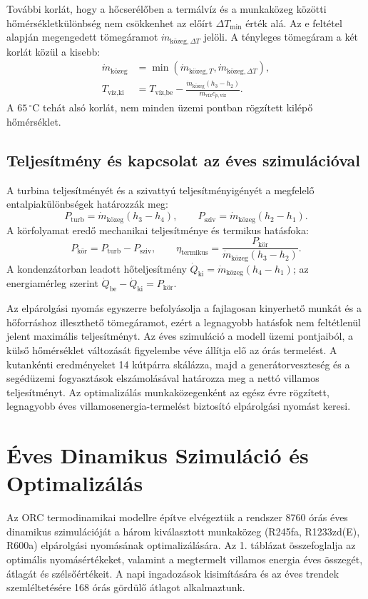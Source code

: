\documentclass[12pt]{article}
\begin{document}
További korlát, hogy a hőcserélőben a termálvíz és a munkaközeg
közötti hőmérsékletkülönbség nem csökkenhet az előírt
$\Delta T_{\text{min}}$ érték alá. Az e feltétel alapján
megengedett tömegáramot $\dot m_{\text{közeg},\Delta T}$ jelöli.
A tényleges tömegáram a két korlát közül a kisebb:
\begin{align}
    \dot m_{\text{közeg}}
    &=\min\left(\dot m_{\text{közeg},T},
                \dot m_{\text{közeg},\Delta T}\right),\\
    T_{\text{víz,ki}}
    &=T_{\text{víz,be}}
    -\frac{\dot m_{\text{közeg}}(h_3-h_2)}
    {\dot m_{\text{víz}}c_{p,\text{víz}}}.
\end{align}
A $65\,^\circ\mathrm{C}$ tehát alsó korlát, nem minden üzemi pontban
rögzített kilépő hőmérséklet.

\subsection{Teljesítmény és kapcsolat az éves szimulációval}

A turbina teljesítményét és a szivattyú teljesítményigényét
a megfelelő entalpiakülönbségek határozzák meg:
\begin{equation}
    P_{\text{turb}}=\dot m_{\text{közeg}}(h_3-h_4),
    \qquad
    P_{\text{sziv}}=\dot m_{\text{közeg}}(h_2-h_1).
\end{equation}
A körfolyamat eredő mechanikai teljesítménye és termikus hatásfoka:
\begin{equation}
    P_{\text{kör}}=P_{\text{turb}}-P_{\text{sziv}},
    \qquad
    \eta_{\text{termikus}}
    =\frac{P_{\text{kör}}}
    {\dot m_{\text{közeg}}(h_3-h_2)}.
\end{equation}
A kondenzátorban leadott hőteljesítmény
$\dot Q_{\text{ki}}=\dot m_{\text{közeg}}(h_4-h_1)$;
az energiamérleg szerint
$\dot Q_{\text{be}}-\dot Q_{\text{ki}}=P_{\text{kör}}$.

Az elpárolgási nyomás egyszerre befolyásolja a fajlagosan kinyerhető
munkát és a hőforráshoz illeszthető tömegáramot, ezért a legnagyobb
hatásfok nem feltétlenül jelent maximális teljesítményt.
Az éves szimuláció a modell üzemi pontjaiból, a külső hőmérséklet
változását figyelembe véve állítja elő az órás termelést.
A kutankénti eredményeket 14 kútpárra skálázza, majd a
generátorveszteség és a segédüzemi fogyasztások elszámolásával
határozza meg a nettó villamos teljesítményt. Az optimalizálás
munkaközegenként az egész évre rögzített, legnagyobb éves
villamosenergia-termelést biztosító elpárolgási nyomást keresi.
\newpage \section{Éves Dinamikus Szimuláció és Optimalizálás}
Az ORC termodinamikai modellre építve elvégeztük a rendszer 8760 
órás éves dinamikus szimulációját a három kiválasztott munkaközeg 
(R245fa, R1233zd(E), R600a) elpárolgási nyomásának optimalizálására. 
Az 1. táblázat összefoglalja az optimális nyomásértékeket, valamint a 
megtermelt villamos energia éves összegét, átlagát és szélsőértékeit. 
A napi ingadozások kisimítására és az éves trendek szemléltetésére 168 
órás gördülő átlagot alkalmaztunk.
\end{document}
